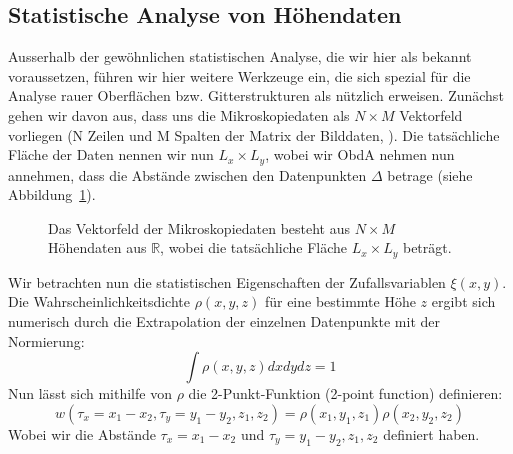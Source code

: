\subsection{Statistische Analyse von Höhendaten}
\usetikzlibrary{decorations.pathreplacing}
Ausserhalb der gewöhnlichen statistischen Analyse, die wir
hier als bekannt voraussetzen, führen wir hier weitere Werkzeuge
ein, die sich spezial für die Analyse rauer Oberflächen bzw. 
Gitterstrukturen als nützlich erweisen\cite{gwyddion}. Zunächst
gehen wir davon aus, dass uns die Mikroskopiedaten als 
$N \times M$ Vektorfeld vorliegen (N Zeilen und M Spalten der
Matrix der Bilddaten, ). Die tatsächliche Fläche der Daten
nennen wir nun $L_x \times L_y$, wobei 
wir ObdA nehmen nun annehmen, dass die Abstände
zwischen den Datenpunkten $\Delta$ betrage 
(siehe Abbildung~\ref{fig:stat1}). 

\begin{figure}
\caption{Das Vektorfeld der Mikroskopiedaten besteht aus 
$N \times M$ Höhendaten aus $\mathbb{R}$, wobei die tatsächliche 
Fläche $L_x \times L_y$ beträgt.}

\label{fig:stat1}
\end{figure}
Wir betrachten nun 
die statistischen Eigenschaften der Zufallsvariablen $\xi(x,y)$. 
Die Wahrscheinlichkeitsdichte $\rho(x,y,z)$ für eine 
bestimmte Höhe $z$ ergibt sich numerisch
durch die Extrapolation der einzelnen Datenpunkte mit der Normierung:
\begin{equation*}
\int \rho(x,y,z) dx dy dz = 1
\end{equation*}
Nun lässt sich mithilfe von $\rho$ die 2-Punkt-Funktion
(2-point function) definieren:
\begin{equation}
w(\tau_x=x_1-x_2, \tau_y=y_1-y_2,z_1,z_2) = \rho(x_1,y_1,z_1)
\rho(x_2,y_2,z_2)
\end{equation}
Wobei wir die Abstände $\tau_x=x_1-x_2$ und $\tau_y=y_1-y_2,z_1,z_2$
definiert haben.
